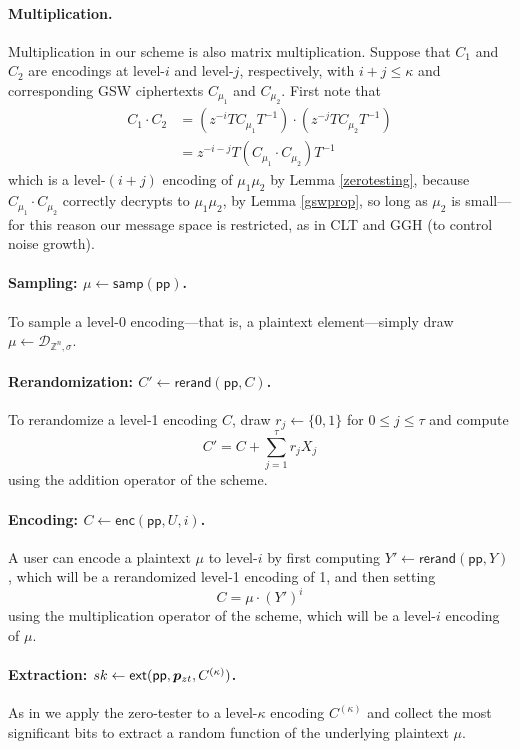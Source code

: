 \paragraph{Multiplication.}  Multiplication in our scheme is also matrix multiplication.  Suppose that $C_1$ and $C_2$ are encodings at level-$i$ and level-$j$, respectively, with $i+j \leq \kappa$ and corresponding GSW ciphertexts $C_{\mu_1}$ and $C_{\mu_2}$.  First note that
\begin{align*}
C_1\cdot C_2 &= (z^{-i}TC_{\mu_1}T^{-1})\cdot(z^{-j}TC_{\mu_2}T^{-1})\\
&= z^{-i-j}T(C_{\mu_1}\cdot C_{\mu_2})T^{-1}
\end{align*}
which is a level-$(i+j)$ encoding of $\mu_1\mu_2$ by Lemma \ref{zerotesting}, because $C_{\mu_1} \cdot C_{\mu_2}$ correctly decrypts to $\mu_1\mu_2$, by Lemma \ref{gswprop}, so long as $\mu_2$ is small---for this reason our message space is restricted, as in CLT and GGH (to control noise growth).

\paragraph{Sampling:  $\mu \leftarrow \mathsf{samp}(\mathsf{pp})$.}  To sample a level-0 encoding---that is, a plaintext element---simply draw $\mu\leftarrow \mathcal{D}_{\mathbb{Z}^n, \sigma}$.

\paragraph{Rerandomization: $C' \leftarrow \mathsf{rerand}(\mathsf{pp}, C)$.}  To rerandomize a level-1 encoding $C$, draw $r_j \leftarrow \{0,1\}$ for $0 \leq j \leq \tau$ and compute $$C' = C + \sum_{j=1}^\tau r_jX_j$$ using the addition operator of the scheme.

\paragraph{Encoding:  $C \leftarrow \mathsf{enc}(\mathsf{pp},U,i)$.}  A user can encode a plaintext $\mu$ to level-$i$ by first computing $Y' \leftarrow \mathsf{rerand}(\mathsf{pp}, Y)$, which will be a rerandomized level-1 encoding of 1, and then setting $$C = \mu \cdot \left(Y'\right)^i$$ using the multiplication operator of the scheme, which will be a level-$i$ encoding of $\mu$.

\paragraph{Extraction: $sk \leftarrow \mathsf{ext}(\mathsf{pp}, \bm{p}_{zt}, C^{(\kappa)})$.}  As in \cite{ggh13a, clt15} we apply the zero-tester to a level-$\kappa$ encoding $C^{(\kappa)}$ and collect the most significant bits to extract a random function of the underlying plaintext $\mu$.

